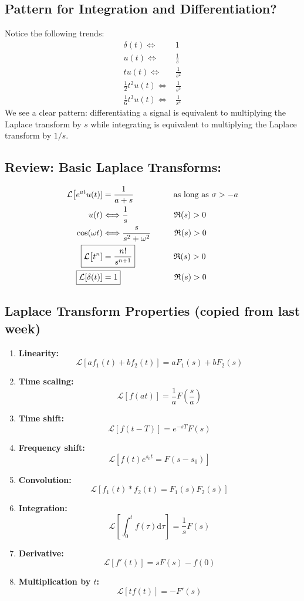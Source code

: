 \documentclass[10pt]{article}
\newcommand{\llra}{\Longleftrightarrow}
\newcommand{\laplace}{\mathcal{L}}
\newcommand{\dd}{\text{d}}
\begin{document}
\subsection*{Pattern for Integration and Differentiation?}
Notice the following trends:
\begin{align*}
    \delta(t) \llra& 1\\
    u(t) \llra& \frac{1}{s}\\
    tu(t) \llra& \frac{1}{s^2}\\
    \frac{1}{2}t^2 u(t) \llra& \frac{1}{s^3}\\
    \frac{1}{6}t^3 u(t) \llra& \frac{1}{s^4} 
\end{align*}
We see a clear pattern: differentiating a signal is equivalent to multiplying the Laplace transform by $s$ while integrating is equivalent to multiplying the Laplace transform by $1/s$.
\subsection*{Review: Basic Laplace Transforms:}
\begin{align*}
    \laplace\big[e^{at}u(t)] &= \frac{1}{a + s} \hspace{1.7cm} \text{as long as $\sigma > -a$}\\
    u(t) &\llra \frac{1}{s} \hspace{1.95cm} \mathfrak{R}(s) > 0\\
    \cos(\omega t) &\llra \frac{s}{s^2 + \omega^2} \hspace{1cm} \mathfrak{R}(s) > 0\\
    \Aboxed{\laplace\big[t^n] &= \frac{n!}{s^{n + 1}}} \hspace{1.65cm} \mathfrak{R}(s) > 0\\
    \Aboxed{\laplace[\delta(t)] &= 1} \hspace{2.3cm} \mathfrak{R}(s) > 0
\end{align*}
\subsection*{Laplace Transform Properties (copied from last week)}
\begin{enumerate}[label=\arabic*.]
    \item \textbf{Linearity:}
    \[\boxed{\laplace[af_1(t) + bf_2(t)] = aF_1(s) + bF_2(s)}\]
    \item \textbf{Time scaling:}
    \[\boxed{\laplace[f(at)] = \frac{1}{a} F\left(\frac{s}{a}\right)}\]
    \item \textbf{Time shift:}
    \[\boxed{\laplace[f(t - T)] = e^{-sT} F(s)}\]
    \item \textbf{Frequency shift:}
    \[\boxed{\laplace[f(t) e^{s_0 t} = F(s - s_0)]}\]
    \item \textbf{Convolution:}
    \[\boxed{\laplace[f_1(t) * f_2(t) = F_1(s) F_2(s)]}\]
    \item \textbf{Integration:}
    \[\boxed{\laplace\left[\int_0^t f(\tau) \dd \tau\right] = \frac{1}{s} F(s)}\]
    \item \textbf{Derivative:}
    \[\boxed{\laplace[f'(t)] = sF(s) - f(0)}\]
    \item \textbf{Multiplication by $t$:}
    \[\boxed{\laplace[t f(t)] = -F'(s)}\]
\end{enumerate}
\end{document}
